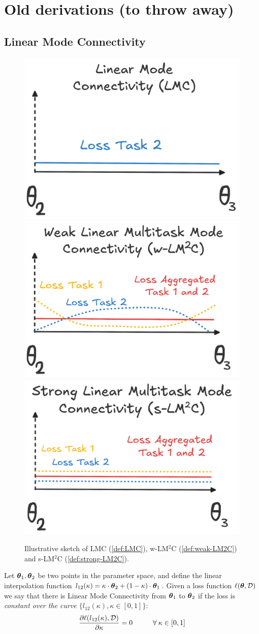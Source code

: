 \documentclass{article} %
\begin{document}
\newpage

\section{Old derivations (to throw away)}

\subsection{Linear Mode Connectivity}

\begin{figure}
    \centering
    \includegraphics[width=0.28\linewidth]{figures/LMC.png}
    \includegraphics[width=0.3\linewidth]{figures/wLM2C.png}
    \includegraphics[width=0.3\linewidth]{figures/sLM2C.png}
    \caption{
    Illustrative sketch of LMC (\cref{def:LMC}), w-LM$^2$C (\cref{def:weak-LM2C}) and s-LM$^2$C (\cref{def:strong-LM2C}).
    }
    \label{fig:sketch-definitions}
\end{figure}




\begin{defn}
    Let $\mbox{$\mbox{$\boldsymbol{\theta}$}$}_1, \mbox{$\mbox{$\boldsymbol{\theta}$}$}_2$ be two points in the parameter space, and define the linear interpolation function $l_{12}(\kappa) = \kappa\cdot \mbox{$\mbox{$\boldsymbol{\theta}$}$}_{2} + (1-\kappa)\cdot \mbox{$\mbox{$\boldsymbol{\theta}$}$}_{1}$. Given a loss function $\ell(\mbox{$\mbox{$\boldsymbol{\theta}$}$}, \mbox{${\cal D}$})$ we say that there is Linear Mode Connectivity from $\mbox{$\mbox{$\boldsymbol{\theta}$}$}_{1}$ to $\mbox{$\mbox{$\boldsymbol{\theta}$}$}_{2}$ if the loss is \emph{constant over the curve $\{l_{12}(\kappa), \kappa \in [0,1]\}$}:
\begin{align}
    \frac{\partial{\ell(l_{12}(\kappa), \mbox{${\cal D}$})}}{\partial{\kappa}} = 0 \hspace{1cm}\forall \:\kappa \in [0,1]
\end{align}
\end{defn}
\end{document}
